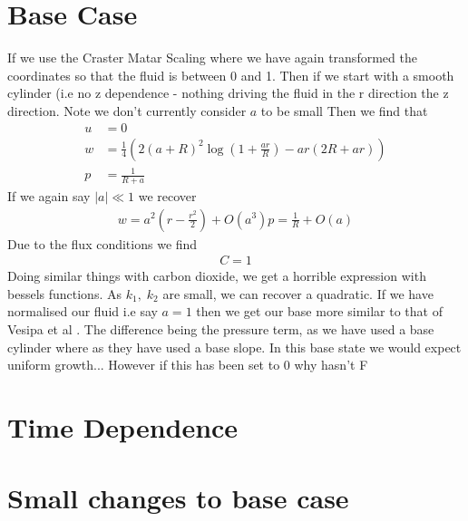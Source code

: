\documentclass[12pt]{article}
\begin{document}
\section{Base Case}
If we use the Craster Matar Scaling where we have again transformed the coordinates so that the fluid is between 0 and 1. Then if we start with a smooth cylinder (i.e no z dependence - nothing driving the fluid in the r direction the z direction. Note we don't currently consider $a$ to be small
Then we find that 
\begin{align}
u &= 0 \\
w&= \frac{1}{4}\left(2(a+R)^2\log\left(1+\frac{ar}{R}\right)-ar(2R+ar)\right)\\
p &= \frac{1}{R+a}
\end{align}
If we again say $|a|\ll 1 $ we recover
\begin{align}
w = a^2\left(r-\frac{r^2}{2}\right)+O(a^3)
p = \frac{1}{R}+ O(a)
\end{align}
Due to the flux conditions we find 
\begin{align}
C = 1
\end{align}
Doing similar things with carbon dioxide, we get a horrible expression with bessels functions. As $k_1,\; k_2$ are small, we can recover a quadratic. If we have normalised our fluid i.e say $a = 1$ then we get our base more similar to that of Vesipa et al \cite{doi:10.1098/rspa.2015.0031}. The difference being the pressure term, as we have used a base cylinder where as they have used a base slope. In this base state we would expect uniform growth... However if this has been set to 0 why hasn't F
\section{Time Dependence}

\section{Small changes to base case}
\end{document}
